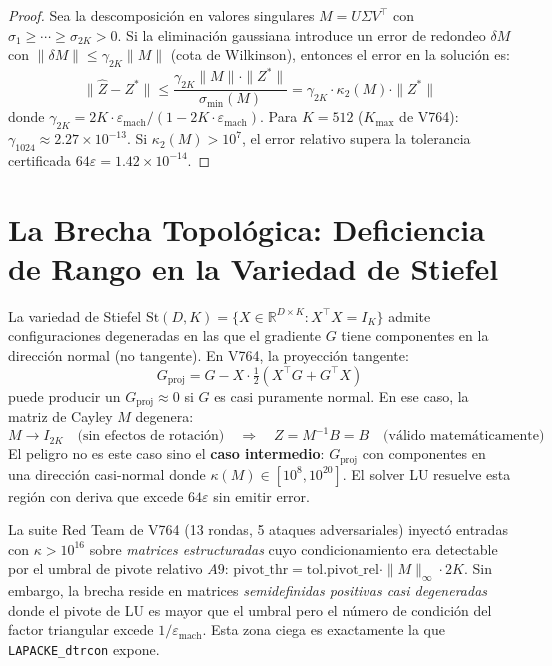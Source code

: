 \begin{proof}
Sea la descomposición en valores singulares $M = U\Sigma V^\top$ con
$\sigma_1 \ge \cdots \ge \sigma_{2K} > 0$. Si la eliminación gaussiana introduce un error
de redondeo $\delta M$ con $\|\delta M\| \le \gamma_{2K} \|M\|$ (cota de Wilkinson),
entonces el error en la solución es:
\begin{equation}
  \|\hat{Z} - Z^*\| \le \frac{\gamma_{2K} \|M\| \cdot \|Z^*\|}{\sigma_{\min}(M)}
  = \gamma_{2K} \cdot \kappa_2(M) \cdot \|Z^*\|
\end{equation}
donde $\gamma_{2K} = 2K \cdot \varepsilon_{\text{mach}} / (1 - 2K \cdot \varepsilon_{\text{mach}})$.
Para $K = 512$ ($K_{\max}$ de V764): $\gamma_{1024} \approx 2.27 \times 10^{-13}$.
Si $\kappa_2(M) > 10^{7}$, el error relativo supera la tolerancia certificada $64\varepsilon = 1.42 \times 10^{-14}$.
\end{proof}

\section{La Brecha Topológica: Deficiencia de Rango en la Variedad de Stiefel}

La variedad de Stiefel $\mathrm{St}(D, K) = \{X \in \mathbb{R}^{D \times K} : X^\top X = I_K\}$
admite configuraciones degeneradas en las que el gradiente $G$ tiene componentes en la
dirección normal (no tangente). En V764, la proyección tangente:
\begin{equation}
  G_{\text{proj}} = G - X \cdot \tfrac{1}{2}(X^\top G + G^\top X)
\end{equation}
puede producir un $G_{\text{proj}} \approx 0$ si $G$ es casi puramente normal.
En ese caso, la matriz de Cayley $M$ degenera:
\begin{equation}
  M \to I_{2K} \quad \text{(sin efectos de rotación)} \quad \Rightarrow \quad
  Z = M^{-1}B = B \quad \text{(válido matemáticamente)}
\end{equation}
El peligro no es este caso sino el \textbf{caso intermedio}: $G_{\text{proj}}$ con
componentes en una dirección casi-normal donde $\kappa(M) \in [10^{8}, 10^{20}]$.
El solver LU resuelve esta región con deriva que excede $64\varepsilon$ sin emitir error.

\begin{remark}
La suite Red Team de V764 (13 rondas, 5 ataques adversariales) inyectó entradas
con $\kappa > 10^{16}$ sobre \textit{matrices estructuradas} cuyo condicionamiento era
detectable por el umbral de pivote relativo $A9$: $\text{pivot\_thr} = \text{tol.pivot\_rel} \cdot \|M\|_\infty \cdot 2K$.
Sin embargo, la brecha reside en matrices \textit{semidefinidas positivas casi degeneradas}
donde el pivote de LU es mayor que el umbral pero el número de condición del factor triangular
excede $1/\varepsilon_{\text{mach}}$. Esta zona ciega es exactamente la que
\texttt{LAPACKE\_dtrcon} expone.
\end{remark}

